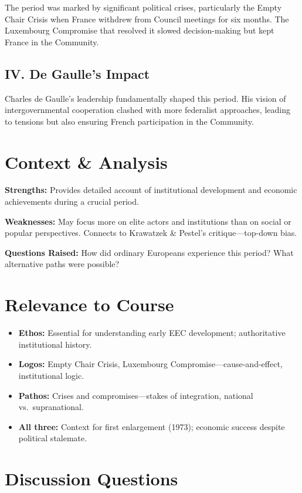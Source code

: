 \documentclass[11pt,a4paper]{article}
\begin{document}
The period was marked by significant political crises, particularly the Empty Chair Crisis when France withdrew from Council meetings for six months. The Luxembourg Compromise that resolved it slowed decision-making but kept France in the Community.

\subsection*{IV. De Gaulle's Impact}

Charles de Gaulle's leadership fundamentally shaped this period. His vision of intergovernmental cooperation clashed with more federalist approaches, leading to tensions but also ensuring French participation in the Community.

\section*{Context \& Analysis}

\textbf{Strengths:} Provides detailed account of institutional development and economic achievements during a crucial period.

\textbf{Weaknesses:} May focus more on elite actors and institutions than on social or popular perspectives. Connects to Krawatzek \& Pestel's critique---top-down bias.

\textbf{Questions Raised:} How did ordinary Europeans experience this period? What alternative paths were possible?

\section*{Relevance to Course}

\begin{itemize}
\item \textbf{Ethos:} Essential for understanding early EEC development; authoritative institutional history.
\item \textbf{Logos:} Empty Chair Crisis, Luxembourg Compromise---cause-and-effect, institutional logic.
\item \textbf{Pathos:} Crises and compromises---stakes of integration, national vs.\ supranational.
\item \textbf{All three:} Context for first enlargement (1973); economic success despite political stalemate.
\end{itemize}

\section*{Discussion Questions}
\end{document}
